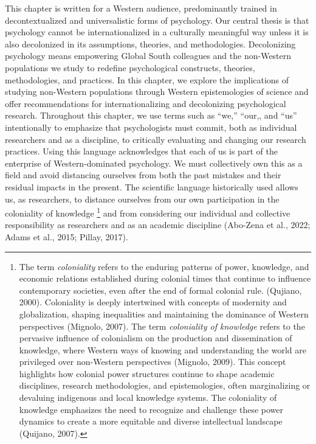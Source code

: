 \documentclass[
  11pt,
]{book}
\begin{document}
This chapter is written for a Western audience, predominantly trained in decontextualized and universalistic forms of psychology. Our central thesis is that psychology cannot be internationalized in a culturally meaningful way unless it is also decolonized in its assumptions, theories, and methodologies. Decolonizing psychology means empowering Global South colleagues and the non-Western populations we study to redefine psychological constructs, theories, methodologies, and practices. In this chapter, we explore the implications of studying non-Western populations through Western epistemologies of science and offer recommendations for internationalizing and decolonizing psychological research. Throughout this chapter, we use terms such as ``we,'' ``our,, and ``us'' intentionally to emphasize that psychologists must commit, both as individual researchers and as a discipline, to critically evaluating and changing our research practices. Using this language acknowledges that each of us is part of the enterprise of Western-dominated psychology. We must collectively own this as a field and avoid distancing ourselves from both the past mistakes and their residual impacts in the present. The scientific language historically used allows us, as researchers, to distance ourselves from our own participation in the coloniality of knowledge \footnote{The term \emph{coloniality} refers to the enduring patterns of power, knowledge, and economic relations established during colonial times that continue to influence contemporary societies, even after the end of formal colonial rule. (Qujiano, 2000). Coloniality is deeply intertwined with concepts of modernity and globalization, shaping inequalities and maintaining the dominance of Western perspectives (Mignolo, 2007). The term \emph{coloniality of knowledge} refers to the pervasive influence of colonialism on the production and dissemination of knowledge, where Western ways of knowing and understanding the world are privileged over non-Western perspectives (Mignolo, 2009). This concept highlights how colonial power structures continue to shape academic disciplines, research methodologies, and epistemologies, often marginalizing or devaluing indigenous and local knowledge systems. The coloniality of knowledge emphasizes the need to recognize and challenge these power dynamics to create a more equitable and diverse intellectual landscape (Quijano, 2007).} and from considering our individual and collective responsibility as researchers and as an academic discipline (Abo-Zena et al., 2022; Adams et al., 2015; Pillay, 2017).
\end{document}
